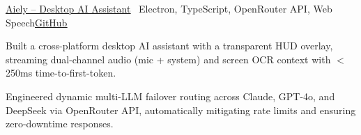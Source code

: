\begin{cvproject}{\href{https://github.com/grvsnh/aiely}{\uline{Aiely -- Desktop AI Assistant}} \textbar\ Electron, TypeScript, OpenRouter API, Web Speech}{\href{https://github.com/grvsnh/aiely}{\uline{GitHub}}}
    \item Built a cross-platform desktop AI assistant with a transparent HUD overlay, streaming dual-channel audio (mic + system) and screen OCR context with $<$250ms time-to-first-token.
    \item Engineered dynamic multi-LLM failover routing across Claude, GPT-4o, and DeepSeek via OpenRouter API, automatically mitigating rate limits and ensuring zero-downtime responses.
\end{cvproject}